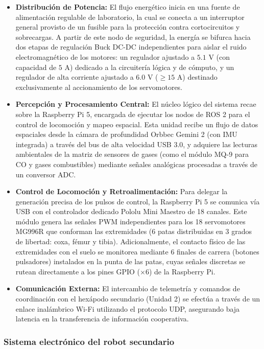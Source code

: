 \begin{itemize}
    \item \textbf{Distribución de Potencia:} El flujo energético inicia en una fuente de alimentación regulable de laboratorio, la cual se conecta a un interruptor general provisto de un fusible para la protección contra cortocircuitos y sobrecargas. A partir de este nodo de seguridad, la energía se bifurca hacia dos etapas de regulación Buck DC-DC independientes para aislar el ruido electromagnético de los motores: un regulador ajustado a $5.1\text{ V}$ (con capacidad de $5\text{ A}$) dedicado a la circuitería lógica y de cómputo, y un regulador de alta corriente ajustado a $6.0\text{ V}$ ($\ge 15\text{ A}$) destinado exclusivamente al accionamiento de los servomotores.
    \item \textbf{Percepción y Procesamiento Central:} El núcleo lógico del sistema recae sobre la Raspberry Pi 5, encargada de ejecutar los nodos de ROS 2 para el control de locomoción y mapeo espacial. Esta unidad recibe un flujo de datos espaciales desde la cámara de profundidad Orbbec Gemini 2 (con IMU integrada) a través del bus de alta velocidad USB 3.0, y adquiere las lecturas ambientales de la matriz de sensores de gases (como el módulo MQ-9 para $\text{CO}$ y gases combustibles) mediante señales analógicas procesadas a través de un conversor ADC.
    \item \textbf{Control de Locomoción y Retroalimentación:} Para delegar la generación precisa de los pulsos de control, la Raspberry Pi 5 se comunica vía USB con el controlador dedicado Pololu Mini Maestro de 18 canales. Este módulo genera las señales PWM independientes para los 18 servomotores MG996R que conforman las extremidades (6 patas distribuidas en 3 grados de libertad: coxa, fémur y tibia). Adicionalmente, el contacto físico de las extremidades con el suelo se monitorea mediante 6 finales de carrera (botones pulsadores) instalados en la punta de las patas, cuyas señales discretas se rutean directamente a los pines GPIO ($\times 6$) de la Raspberry Pi.
    \item \textbf{Comunicación Externa:} El intercambio de telemetría y comandos de coordinación con el hexápodo secundario (Unidad 2) se efectúa a través de un enlace inalámbrico Wi-Fi utilizando el protocolo UDP, asegurando baja latencia en la transferencia de información cooperativa.
\end{itemize}

\subsubsection{Sistema electrónico del robot secundario}

